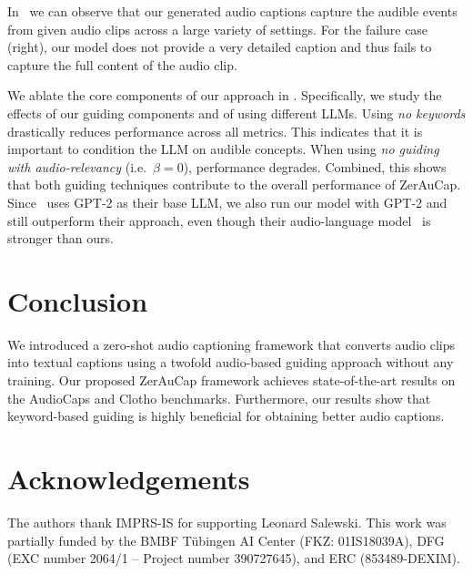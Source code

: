 \documentclass{article}
\newcommand{\modelName}{ZerAuCap\xspace}
\newcommand{\mypara}[1]{\vspace{2pt}\noindent{\bf{#1}}}
\begin{document}
\mypara{Qualitative results.}
In~ we can observe that our generated audio captions capture the audible events from given audio clips across a large variety of settings.
For the failure case (right), our model does not provide a very detailed caption and thus fails to capture the full content of the audio clip.

\mypara{Ablations.} We ablate the core components of our approach in . Specifically, we study the effects of our guiding components and of using different LLMs\@. Using \emph{no keywords} drastically reduces performance across all metrics. This indicates that it is important to condition the LLM on audible concepts.
When using \emph{no guiding with audio-relevancy} (i.e.\ $\beta=0$), performance degrades. Combined, this shows that both guiding techniques contribute to the overall performance of \modelName.
Since~\cite{shaharabany2023zero} uses GPT-2 as their base LLM, we also run our model with GPT-2 and still outperform their approach, even though their audio-language model~\cite{Girdhar2023ImageBindOE} is stronger than ours.




\section{Conclusion}
We introduced a zero-shot audio captioning framework that converts audio clips into textual captions using a twofold audio-based guiding approach without any training. Our proposed \modelName framework achieves state-of-the-art results on the AudioCaps and Clotho benchmarks. Furthermore, our results show that keyword-based guiding is highly beneficial for obtaining better audio captions.


\section{Acknowledgements}
The authors thank IMPRS-IS for supporting Leonard Salewski. This work was partially funded by the BMBF Tübingen AI Center (FKZ: 01IS18039A), DFG (EXC number 2064/1 – Project number 390727645), and ERC (853489-DEXIM).




\end{document}
